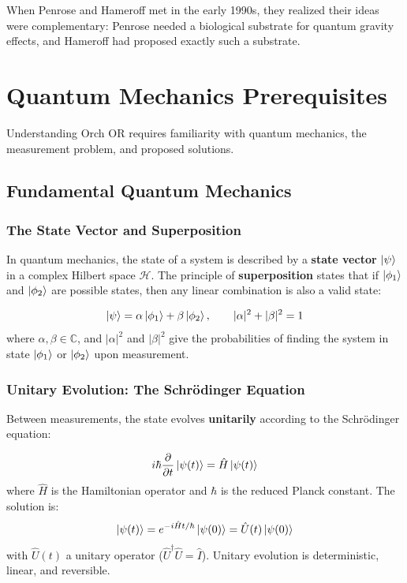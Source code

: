 \documentclass[11pt,a4paper]{report}
\begin{document}
When Penrose and Hameroff met in the early 1990s, they realized their ideas were complementary: Penrose needed a biological substrate for quantum gravity effects, and Hameroff had proposed exactly such a substrate.


\chapter{Quantum Mechanics Prerequisites}

Understanding Orch OR requires familiarity with quantum mechanics, the measurement problem, and proposed solutions.

\section{Fundamental Quantum Mechanics}

\subsection{The State Vector and Superposition}

In quantum mechanics, the state of a system is described by a \textbf{state vector} $\ket{\psi}$ in a complex Hilbert space $\mathcal{H}$. The principle of \textbf{superposition} states that if $\ket{\phi_1}$ and $\ket{\phi_2}$ are possible states, then any linear combination is also a valid state:

\begin{mathbox}
\vspace{-8pt}
\[
  \ket{\psi} = \alpha\ket{\phi_1} + \beta\ket{\phi_2}, \qquad |\alpha|^2 + |\beta|^2 = 1
\]
where $\alpha, \beta \in \mathbb{C}$, and $|\alpha|^2$ and $|\beta|^2$ give the probabilities of finding the system in state $\ket{\phi_1}$ or $\ket{\phi_2}$ upon measurement.
\vspace{-4pt}
\end{mathbox}

\subsection{Unitary Evolution: The Schr\"odinger Equation}

Between measurements, the state evolves \textbf{unitarily} according to the Schr\"odinger equation:

\begin{mathbox}
\vspace{-8pt}
\[
  i\hbar \frac{\partial}{\partial t}\ket{\psi(t)} = \hat{H}\ket{\psi(t)}
\]
where $\hat{H}$ is the Hamiltonian operator and $\hbar$ is the reduced Planck constant. The solution is:
\[
  \ket{\psi(t)} = e^{-i\hat{H}t/\hbar}\ket{\psi(0)} = \hat{U}(t)\ket{\psi(0)}
\]
with $\hat{U}(t)$ a unitary operator ($\hat{U}^\dagger \hat{U} = \hat{I}$). Unitary evolution is deterministic, linear, and reversible.
\vspace{-4pt}
\end{mathbox}
\end{document}
